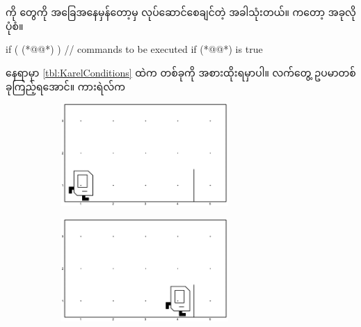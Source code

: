 \begin{sloppypar}
\section{  }
\enIfStatement ကို \mmcommand တွေကို အခြေအနေမှန်တော့မှ လုပ်ဆောင်စေချင်တဲ့ အခါသုံးတယ်။ \mmsyntax ကတော့ အခုလိုပုံစံ။
\begin{lstcodeminimal}
if ( (*@@*) ) {
        // commands to be executed if (*@@*) is true
}
\end{lstcodeminimal}
\noindent {} နေရာမှာ \Tbl \vref*{tbl:KarelConditions} ထဲက \mmCondition တစ်ခုကို အစားထိုးရမှာပါ။ လက်တွေ့ ဥပမာတစ်ခုကြည့်ရအောင်။ ကားရဲလ်က 

\begin{figure}[tbh!]
    \caption{}
    \begin{subfigure}[t]{0.46\textwidth}
        \includegraphics[width=2.5in, left]{ch02/MoveBeeperToOtherSide/init_w1.jpg}
        \caption{}
        \label{subfig:MooveMoveBeeperToOtherSideInitW1}
    \end{subfigure}
    \hspace{0.1in}
    \begin{subfigure}[t]{0.46\textwidth}
        \includegraphics[width=2.5in, left]{ch02/MoveBeeperToOtherSide/final_w1.jpg}
        \caption{}
    \end{subfigure}


\end{figure}
\end{sloppypar}
